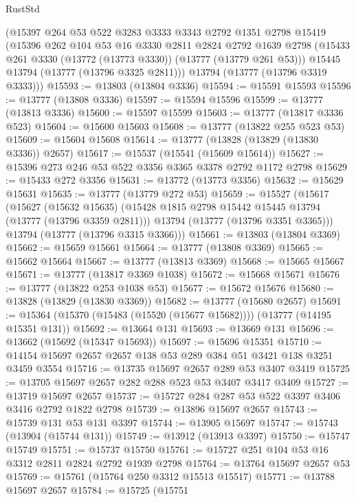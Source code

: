 \begin{lexlean}{RustStd}
\begin{coremodule}
    (@15397
      @264
      @53
      @522
      @3283
      @3333
      @3343
      @2792
      @1351
      @2798
      @15419
      (@15396
        @262
        @104
        @53
        @16
        @3330
        @2811
        @2824
        @2792
        @1639
        @2798
        (@15433 @261 @3330 (@13772 (@13773 @3330)) (@13777 (@13779 @261 @53)))
        @15445
        @13794
        (@13777 (@13796 @3325 @2811)))
      @13794
      (@13777 (@13796 @3319 @3333)))
@15593 := @13803 (@13804 @3336)
@15594 := @15591 @15593
@15596 := @13777 (@13808 @3336)
@15597 := @15594 @15596
@15599 := @13777 (@13813 @3336)
@15600 := @15597 @15599
@15603 := @13777 (@13817 @3336 @523)
@15604 := @15600 @15603
@15608 := @13777 (@13822 @255 @523 @53)
@15609 := @15604 @15608
@15614 := @13777 (@13828 (@13829 (@13830 @3336)) @2657)
@15617 := @15537 (@15541 (@15609 @15614))
@15627 := @15396 @273 @246 @53 @522 @3356 @3365 @3378 @2792 @1172 @2798
@15629 := @15433 @272 @3356
@15631 := @13772 (@13773 @3356)
@15632 := @15629 @15631
@15635 := @13777 (@13779 @272 @53)
@15659 := @15527
    (@15617
      (@15627
        (@15632 @15635)
        (@15428 @1815 @2798 @15442 @15445 @13794 (@13777 (@13796 @3359 @2811)))
        @13794
        (@13777 (@13796 @3351 @3365)))
      @13794
      (@13777 (@13796 @3315 @3366)))
@15661 := @13803 (@13804 @3369)
@15662 := @15659 @15661
@15664 := @13777 (@13808 @3369)
@15665 := @15662 @15664
@15667 := @13777 (@13813 @3369)
@15668 := @15665 @15667
@15671 := @13777 (@13817 @3369 @1038)
@15672 := @15668 @15671
@15676 := @13777 (@13822 @253 @1038 @53)
@15677 := @15672 @15676
@15680 := @13828 (@13829 (@13830 @3369))
@15682 := @13777 (@15680 @2657)
@15691 := @15364 (@15370 (@15483 (@15520 (@15677 @15682)))) (@13777 (@14195 @15351 @131))
@15692 := @13664 @131
@15693 := @13669 @131
@15696 := @13662 (@15692 (@15347 @15693))
@15697 := @15696 @15351
@15710 := @14154 @15697 @2657 @2657 @138 @53 @289 @384 @51 @3421 @138 @3251 @3459 @3554
@15716 := @13735 @15697 @2657 @289 @53 @3407 @3419
@15725 := @13705 @15697 @2657 @282 @288 @523 @53 @3407 @3417 @3409
@15727 := @13719 @15697 @2657
@15737 := @15727 @284 @287 @53 @522 @3397 @3406 @3416 @2792 @1822 @2798
@15739 := @13896 @15697 @2657
@15743 := @15739 @131 @53 @131 @3397
@15744 := @13905 @15697
@15747 := @15743 (@13904 (@15744 @131))
@15749 := @13912 (@13913 @3397)
@15750 := @15747 @15749
@15751 := @15737 @15750
@15761 := @15727 @251 @104 @53 @16 @3312 @2811 @2824 @2792 @1939 @2798
@15764 := @13764 @15697 @2657 @53
@15769 := @15761 (@15764 @250 @3312 @15513 @15517)
@15771 := @13788 @15697 @2657
@15784 := @15725
    (@15751

\end{coremodule}
\end{lexlean}
